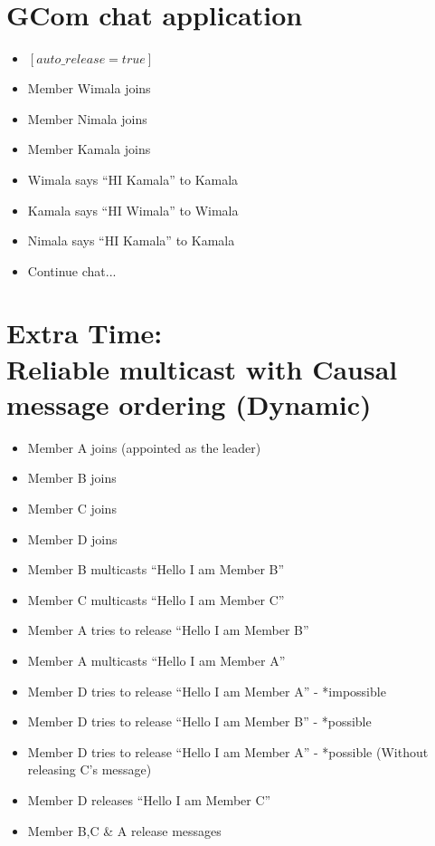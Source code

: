 \documentclass[a4,12pt]{article}
\begin{document}
\section*{GCom chat application}
\begin{itemize}\itemsep 1pt \parskip 1pt \parsep 2pt
\item $[ auto\_release = true ]$
\item Member Wimala joins
\item Member Nimala joins
\item Member Kamala joins
\item Wimala says “HI Kamala” to Kamala
\item Kamala says “HI Wimala” to Wimala
\item Nimala says “HI Kamala” to Kamala
\item Continue chat...
\end{itemize}

\section*{Extra Time:\\Reliable multicast with Causal message ordering (Dynamic)}
\begin{itemize}\itemsep 2pt \parskip 2pt \parsep 2pt
\item Member A joins (appointed as the leader)
\item Member B joins
\item Member C joins
\item Member D joins
\item Member B multicasts “Hello I am Member B”
\item Member C multicasts “Hello I am Member C”
\item Member A tries to release “Hello I am Member B”
\item Member A multicasts “Hello I am Member A”
\item Member D tries to release “Hello I am Member A” - *impossible
\item Member D tries to release “Hello I am Member B” - *possible
\item Member D tries to release “Hello I am Member A” - *possible (Without releasing C’s message)
\item Member D releases “Hello I am Member C”
\item Member B,C \& A release messages
\end{itemize}
\end{document}
